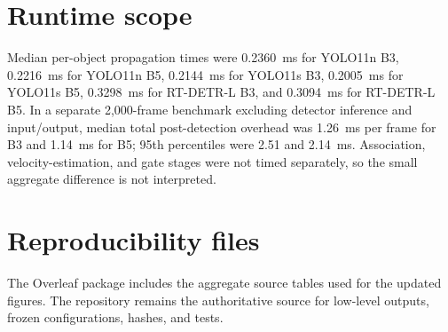 \documentclass[11pt]{article}
\begin{document}
\section{Runtime scope}
Median per-object propagation times were 0.2360~ms for YOLO11n B3, 0.2216~ms for YOLO11n B5, 0.2144~ms for YOLO11s B3, 0.2005~ms for YOLO11s B5, 0.3298~ms for RT-DETR-L B3, and 0.3094~ms for RT-DETR-L B5. In a separate 2,000-frame benchmark excluding detector inference and input/output, median total post-detection overhead was 1.26~ms per frame for B3 and 1.14~ms for B5; 95th percentiles were 2.51 and 2.14~ms. Association, velocity-estimation, and gate stages were not timed separately, so the small aggregate difference is not interpreted.

\section{Reproducibility files}
The Overleaf package includes the aggregate source tables used for the updated figures. The repository remains the authoritative source for low-level outputs, frozen configurations, hashes, and tests.
\end{document}

